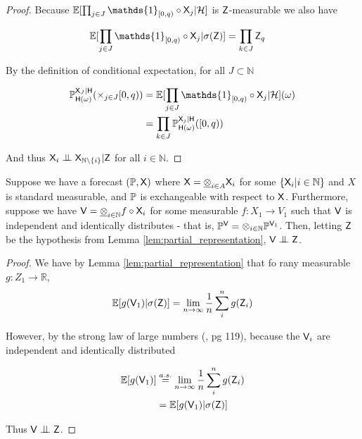 \begin{proof}
Because $\mathbb{E}[\prod_{j\in J} \mathds{1}_{[0,q)}\circ \RV{X}_j|\sigalg{H}]$ is $\mathsf{Z}$-measurable we also have

\begin{align}
    \mathbb{E}[\prod_{j\in J} \mathds{1}_{[0,q)}\circ \RV{X}_j|\sigma(\RV{Z})] &= \prod_{k\in J} \RV{Z}_q
\end{align}

By the definition of conditional expectation, for all $J\subset \mathbb{N}$

\begin{align}
    \prob{P}_{\RV{H}(\omega)}^{\RV{X}_J|\RV{H}}(\times_{j\in J}[0,q)) &= \mathbb{E}[\prod_{j\in J} \mathds{1}_{[0,q)}\circ \RV{X}_j|\sigalg{H}](\omega)\\
                                                                      &= \prod_{k\in J} \prob{P}_{\RV{H}(\omega)}^{\RV{X}_j|\RV{H}}([0,q))
\end{align}

And thus $\RV{X}_i\CI\RV{X}_{\mathbb{N}\setminus\{i\}}|\RV{Z}$ for all $i\in\mathbb{N}$.
\end{proof}

\begin{lemma}\label{lem:iid_rvs}
Suppose we have a forecast $(\mathbb{P},\mathsf{X})$ where $\mathsf{X}=\underline{\otimes}_{i\in A} \mathsf{X}_i$ for some $\{\mathsf{X}_i|i\in \mathbb{N}\}$ and $X$ is standard measurable, and $\mathbb{P}$ is exchangeable with respect to $\mathsf{X}$. Furthermore, suppose we have $\mathsf{V}=\underline{\otimes}_{i\in\mathbb{N}} f\circ \mathsf{X}_i$ for some measurable $f:X_1\to V_1$ such that $\mathsf{V}$ is independent and identically distributes - that is, $\mathbb{P}^{\mathsf{V}} = \otimes_{i\in\mathbb{N}} \mathbb{P}^{\mathsf{V}_1}$. Then, letting $\mathsf{Z}$ be the hypothesis from Lemma \ref{lem:partial_representation}, $\RV{V}\CI\RV{Z}$.
\end{lemma}

\begin{proof}

We have by Lemma \ref{lem:partial_representation} that fo rany measurable $g:Z_1\to \mathbb{R}$,
\begin{align}
    \mathbb{E}[g(\mathsf{V}_1)|\sigma(\mathsf{Z})] = \lim_{n\to\infty} \frac{1}{n}\sum_i^n g(\mathsf{Z}_i)
\end{align}

However, by the strong law of large numbers (\citet{cinlar_probability_2011}, pg 119), because the $\mathsf{V}_i$ are independent and identically distributed

\begin{align}
    \mathbb{E}[g(\mathsf{V}_1)] &\overset{a.s.}{=} \lim_{n\to\infty}\frac{1}{n}\sum_i^n g(\mathsf{Z}_i)\\
                            &= \mathbb{E}[g(\mathsf{V}_1)|\sigma(\mathsf{Z})]
\end{align}

Thus $\RV{V}\CI\RV{Z}$.

\end{proof}

